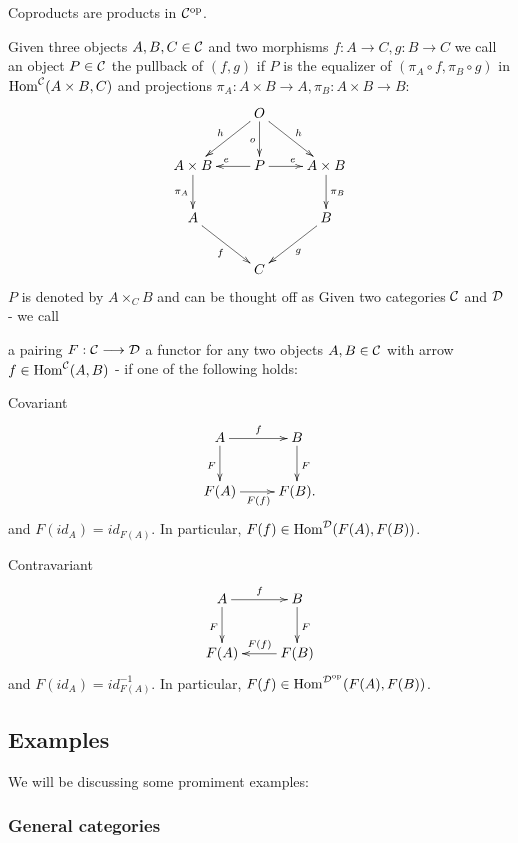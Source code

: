 \en
Coproducts are products in ${\mathcal{C}}^{\rm{op}}$.
\item[pullback] Given three objects $A, B, C \in \mathcal{C}$ and two morphisms $f: A \longrightarrow C, g : B \longrightarrow C$ we call an object $P \in \mathcal{C}$ the pullback of $(f,g)$ if $P$ is the equalizer of $(\pi_A \circ f, \pi_B \circ g)$ in $\mathrm{Hom}^{\mathcal{C}}(A \times B,C)$ and projections $\pi_A : A \times B \longrightarrow A, \pi_B : A \times B \longrightarrow B$:
$$\xymatrix{
&O\ar[rd]^h\ar[ld]_h\ar[d]_o&\\
A \times B\ar[d]_{\pi_A}&P\ar[l]_e\ar[r]^e&A \times B\ar[d]^{\pi_B}\\
A\ar[rd]_f&&B \ar[ld]^g\\
&C&\\
}$$
$P$ is denoted by $A \times_{C} B$ and can be thought off as 
\ed
Given two categories $\mathcal{C}$ and $\mathcal{D}$ - we call 
\begin{defi}[Functors]
a pairing $F : \mathcal{C} \longrightarrow \mathcal{D}$ a functor for any two objects $A, B \in \mathcal{C}$ with arrow  $f \in \mathrm{Hom}^{\mathcal{C}}(A,B)$ - if one of the following holds:
\bd
\item[Covariant] $$\xymatrix{
A \ar[d]_F\ar[r]^f &B\ar[d]^F\\
F(A) \ar[r]_{F(f)}&F(B).\\
}$$ and $F(id_A) = id_{F(A)}$. In particular, $F(f) \in \mathrm{Hom}^{\mathcal{D}}(F(A),F(B))$.
\item[Contravariant] $$\xymatrix{
A \ar[d]_F\ar[r]^f &B\ar[d]^F\\
F(A) &F(B)\ar[l]_{F(f)}\\
}$$ and $F(id_A) = id^{-1}_{F(A)}$. In particular, $F(f) \in \mathrm{Hom}^{{\mathcal{D}}^{\rm{op}}}(F(A),F(B))$.
\ed
\end{defi}
\subsection{Examples} 
We will be discussing some promiment examples:
\subsubsection{General categories}
